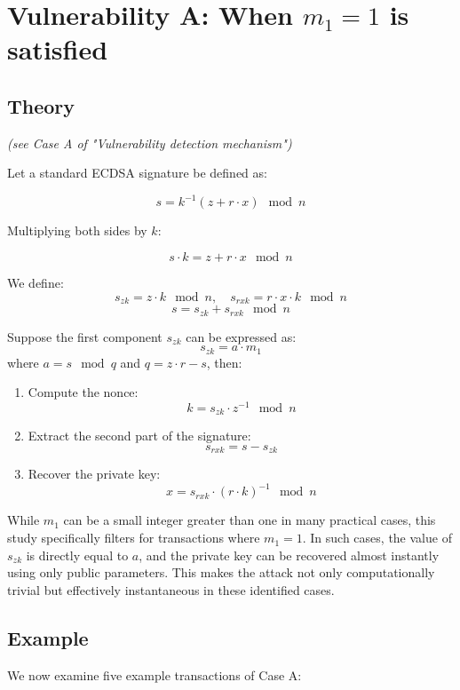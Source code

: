\documentclass[11pt]{article}
\begin{document}
\section{Vulnerability A: When \texorpdfstring{$m_1 = 1$}{m1 = 1} is satisfied}

\subsection{Theory}
\textit{(see Case A of "Vulnerability detection mechanism")}

Let a standard ECDSA signature be defined as:

\[
s = k^{-1}(z + r \cdot x) \mod n
\]

Multiplying both sides by $k$:

\[
s \cdot k = z + r \cdot x \mod n
\]

We define:
\[
s_{zk} = z \cdot k \mod n,\quad
s_{rxk} = r \cdot x \cdot k \mod n
\]
\[
s = s_{zk} + s_{rxk} \mod n
\]

Suppose the first component $s_{zk}$ can be expressed as:
\[
s_{zk} = a \cdot m_1
\]
where $a = s \mod q$ and $q = z \cdot r - s$, then:
\begin{enumerate}
    \item Compute the nonce:
    \[
    k = s_{zk} \cdot z^{-1} \mod n
    \]
    \item Extract the second part of the signature:
    \[
    s_{rxk} = s - s_{zk}
    \]
    \item Recover the private key:
    \[
    x = s_{rxk} \cdot (r \cdot k)^{-1} \mod n
    \]
\end{enumerate}

While \( m_1 \) can be a small integer greater than one in many practical cases, this study specifically filters for transactions where \( m_1 = 1 \). In such cases, the value of \( s_{zk} \) is directly equal to \( a \), and the private key can be recovered almost instantly using only public parameters. This makes the attack not only computationally trivial but effectively instantaneous in these identified cases.

\subsection{Example}
We now examine five example transactions of Case A:
\end{document}
